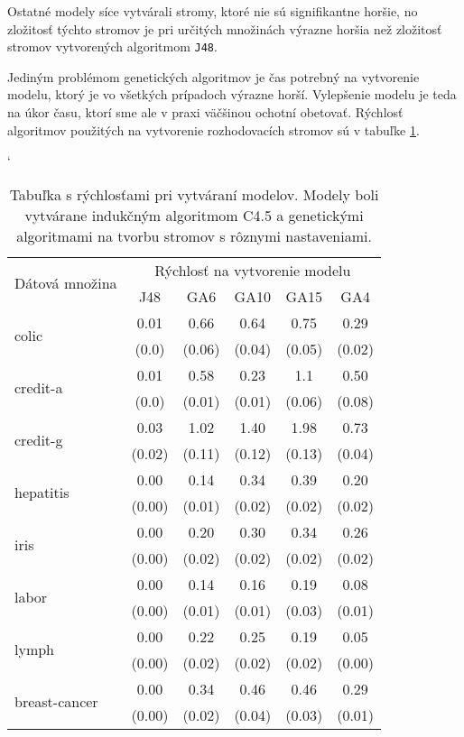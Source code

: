 Ostatné modely síce vytvárali stromy, ktoré nie sú signifikantne horšie, no zložitosť týchto stromov je pri určitých množinách výrazne horšia než zložitosť stromov vytvorených algoritmom \verb|J48|.

Jediným problémom genetických algoritmov je čas potrebný na vytvorenie modelu, ktorý je vo všetkých prípadoch výrazne horší. Vylepšenie modelu je teda na úkor času, ktorí sme ale v praxi väčšinou ochotní obetovať. Rýchlosť algoritmov použitých na vytvorenie rozhodovacích stromov sú v tabuľke \ref{fig:time}.

\begin{table}[t]
\catcode`
\centering 
\newcommand\T{\rule{0pt}{2.6ex}}       %
\newcommand\B{\rule[-1.2ex]{0pt}{0pt}} %
\begin{tabular}{|l||c|c|c|c|c||}
\hline \multirow{2}{*}{Dátová množina} & \multicolumn{5}{|c||}{Rýchlosť na vytvorenie modelu} \\ 
\cline{2-6} & J48 & GA6 & GA10 & GA15 & GA4 \\
\hline
\hline \multirow{2}{*}{colic} & 0.01 & 0.66 & 0.64 & 0.75 & 0.29 \T\\[-1.5ex]
& \tiny (0.0) & \tiny (0.06) & \tiny (0.04) & \tiny (0.05) & \tiny (0.02)\B\\
\hline \multirow{2}{*}{credit-a} & 0.01 & 0.58 & 0.23 & 1.1 & 0.50 \T\\[-1.5ex]
& \tiny (0.0) & \tiny (0.01) & \tiny (0.01) & \tiny (0.06) & \tiny (0.08)\B\\
\hline \multirow{2}{*}{credit-g} & 0.03 & 1.02 & 1.40 & 1.98 & 0.73\T\\[-1.5ex]
& \tiny (0.02) & \tiny (0.11) & \tiny (0.12) & \tiny (0.13) & \tiny (0.04)\B\\
\hline \multirow{2}{*}{hepatitis} & 0.00 & 0.14 & 0.34 & 0.39 & 0.20 \T\\[-1.5ex]
& \tiny (0.00) & \tiny (0.01) & \tiny (0.02) & \tiny (0.02) & \tiny (0.02)\B\\
\hline \multirow{2}{*}{iris} & 0.00 & 0.20 & 0.30 & 0.34 & 0.26 \T\\[-1.5ex]
& \tiny (0.00) & \tiny (0.02) & \tiny (0.02) & \tiny (0.02) & \tiny (0.02)\B\\
\hline \multirow{2}{*}{labor} & 0.00 & 0.14 & 0.16 & 0.19 & 0.08 \T\\[-1.5ex]
& \tiny (0.00) & \tiny (0.01) & \tiny (0.01) & \tiny (0.03) & \tiny (0.01)\B\\
\hline \multirow{2}{*}{lymph} & 0.00 & 0.22 & 0.25 & 0.19 & 0.05 \T\\[-1.5ex]
& \tiny (0.00) & \tiny (0.02) & \tiny (0.02) & \tiny (0.02) & \tiny (0.00)\B\\
\hline \multirow{2}{*}{breast-cancer} & 0.00 & 0.34 & 0.46 & 0.46 & 0.29 \T\\[-1.5ex]
& \tiny (0.00) & \tiny (0.02) & \tiny (0.04) & \tiny (0.03) & \tiny (0.01)\B\\
\hline
\end{tabular}
\caption{Tabuľka s rýchlosťami pri vytváraní modelov. Modely boli vytvárane indukčným algoritmom C4.5 a genetickými algoritmami na tvorbu stromov s rôznymi nastaveniami.}\label{fig:time}
\end{table}

